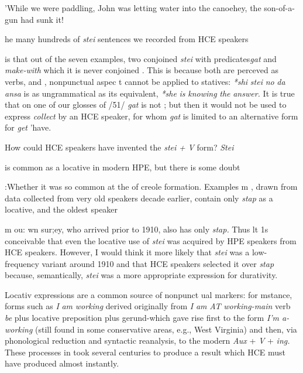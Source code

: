 'While we were paddling, John was letting water into the canoe\-hey, the son-of-a-gun had sunk it!

he many hundreds of \textit{stei} sentences we recorded from HCE speakers

is that out of the seven examples, two conjoined \textit{stei} with predicates\-\textit{gat} and \textit{make-with} which it is never conjoined . This is because both are perceved as  verbs, and , nonpunctual aspec t cannot be applied to statives: \textit{*shi} \textit{stei} \textit{no} \textit{da} \textit{ansa} is as ungrammatical as its  equivalent, \textit{*she} \textit{is} \textit{knowing} \textit{the} \textit{answer.} It is true that on one of our glosses of /51/ \textit{gat} is not ; but then it would not be used to express \textit{collect }by an HCE speaker, for whom \textit{gat }is limited to an alternative form for \textit{get }'have.

How could HCE speakers have invented the \textit{stei} \textit{+} \textit{V} form? \textit{Stei}

is common as a locative in modern HPE, but there is some doubt

:Whether it was so common at the  of creole formation. Examples m \citet{Nagara1972}, drawn from data collected from very old speakers decade earlier, contain only \textit{stap} as a locative, and the oldest speaker

m ou: wn sur;ey, who arrived prior to 1910, also has only \textit{stap.} Thus lt 1s conceivable that even the locative use of \textit{stei} was acquired by HPE speakers from HCE speakers. However, I would think it more likely that \textit{stei} was a low-frequency variant around 1910 and that HCE speakers selected it over \textit{stap} because, semantically, \textit{stei} was a more appropriate expression for durativity.

Locativ expressions are a common source of nonpunct ual markers: for mstance, forms such as \textit{I} \textit{am} \textit{worki}\textit{n}\textit{g} derived originally from \textit{I} \textit{am} \textit{AT} \textit{working-main} verb \textit{be} plus locative preposition plus
gerund-which gave rise first to the form \textit{I'm a-working }(still found in some conservative areas, e.g., West Virginia) and then, via phono\-logical reduction and syntactic reanalysis, to the modern \textit{Aux} + \textit{V} + \textit{i}\textit{n}\textit{g.} These processes in  took several centuries to produce a result which HCE must have produced almost instantly.


